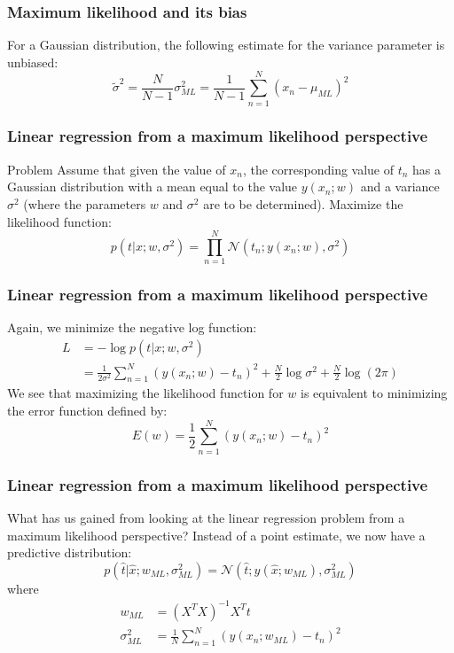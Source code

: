 \documentclass{beamer}
\begin{document}
\begin{frame}
    \frametitle{Maximum likelihood and its bias}
    For a Gaussian distribution, the following estimate for the variance parameter is unbiased:
    \begin{equation*}
        \tilde{\sigma}^{2}=\frac{N}{N-1}\sigma^{2}_{ML}=\frac{1}{N-1}\sum_{n=1}^{N}(x_{n}-\mu_{ML})^{2}
    \end{equation*}
\end{frame}

\begin{frame}
    \frametitle{Linear regression from a maximum likelihood perspective}
    \begin{block}{Problem}
        Assume that given the value of $x_{n}$, the corresponding value of $t_{n}$ has a Gaussian distribution with a mean equal to the value $y(x_{n};w)$ and a variance $\sigma^{2}$ (where the parameters $w$ and $\sigma^{2}$ are to be determined). Maximize the
        likelihood function:
        \begin{equation*}
            p(t|x;w,\sigma^{2})=\prod_{n=1}^{N}\mathcal{N}(t_{n};y(x_{n};w),\sigma^{2})
        \end{equation*}
    \end{block}
\end{frame}

\begin{frame}
    \frametitle{Linear regression from a maximum likelihood perspective}
    Again, we minimize the negative log function:
    \begin{align*}
        L&=-\log{}p(t|x;w,\sigma^{2}) \\
        &=\frac{1}{2\sigma^{2}}\sum_{n=1}^{N}(y(x_{n};w)-t_{n})^{2}+\frac{N}{2}\log\sigma^{2}+\frac{N}{2}\log(2\pi)
    \end{align*}
    We see that maximizing the likelihood function for $w$ is equivalent to minimizing the error function defined by:
    \begin{equation*}
        E(w)=\frac{1}{2}\sum_{n=1}^{N}(y(x_{n};w)-t_{n})^{2}
    \end{equation*}
\end{frame}

\begin{frame}
    \frametitle{Linear regression from a maximum likelihood perspective}
    What has us gained from looking at the linear regression problem from a maximum likelihood perspective? Instead of a point estimate, we now have a predictive distribution:
    \begin{equation*}
        p(\hat{t}|\hat{x};w_{ML},\sigma^{2}_{ML})=\mathcal{N}(\hat{t};y(\hat{x};w_{ML}),\sigma^{2}_{ML})
    \end{equation*}
    where
    \begin{align*}
        w_{ML}&=(X^{T}X)^{-1}X^{T}t \\
        \sigma^{2}_{ML}&=\frac{1}{N}\sum_{n=1}^{N}(y(x_{n};w_{ML})-t_{n})^{2}
    \end{align*}
\end{frame}
\end{document}
